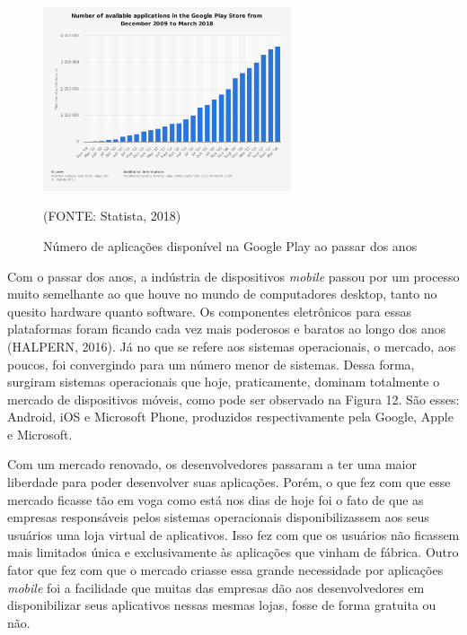 \documentclass[
    12pt,       %
    openright,      %
    twoside,      %
    a4paper,      %
    english,      %
    french,       %
    spanish,      %
    brazil,       %
    ]{abntex2}
\begin{document}
      \begin{figure}[htbp]
            \begin{center}
                \includegraphics[width=0.65\textwidth]{img/numberApps.png}
            \end{center}
        \caption{\label{fig:passaro}Número de aplicações disponível na Google Play ao passar dos anos}
        \begin{center}(FONTE: Statista, 2018)\end{center}
      \end{figure}

      Com o passar dos anos, a indústria de dispositivos \textit{mobile} passou por um processo muito
      semelhante ao que houve no mundo de computadores desktop, tanto no quesito hardware quanto
      software. Os componentes eletrônicos para essas plataformas foram ficando cada vez mais
      poderosos e baratos ao longo dos anos (HALPERN, 2016). Já no que se refere aos sistemas
      operacionais, o mercado, aos poucos, foi convergindo para um número menor de sistemas. Dessa
      forma, surgiram sistemas operacionais que hoje, praticamente, dominam totalmente o mercado de
      dispositivos móveis, como pode ser observado na Figura 12. São esses: Android, iOS e
      Microsoft Phone, produzidos respectivamente pela Google, Apple e Microsoft.

      Com um mercado renovado, os desenvolvedores passaram a ter uma maior liberdade para poder
      desenvolver suas aplicações. Porém, o que fez com que esse mercado ficasse tão em voga
      como está nos dias de hoje foi o fato de que as empresas responsáveis pelos sistemas
      operacionais disponibilizassem aos seus usuários uma loja virtual de aplicativos.
      Isso fez com que os usuários não ficassem mais limitados única e exclusivamente
      às aplicações que vinham de fábrica. Outro fator que fez com que o mercado criasse
      essa grande necessidade por aplicações \textit{mobile} foi a facilidade que muitas das
      empresas dão aos desenvolvedores em disponibilizar seus aplicativos nessas mesmas
      lojas, fosse de forma gratuita ou não.
\end{document}
